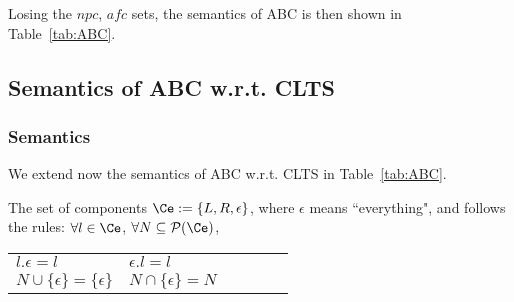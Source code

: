 \documentclass[adraft]{eptcs}
\newcommand{\tab}[1]{Table~\ref{tab:#1}}
\newcommand{\powset}[1]{\mathcal{P}(#1)} %
\newcommand{\npc}{\textit{npc}}                        %
\newcommand{\afc}{\textit{afc}}                        %
\begin{document}
Losing the $\npc$, $\afc$ sets, the semantics of ABC is then shown in \tab{ABC}.


\subsection{Semantics of ABC w.r.t. CLTS}

\subsubsection{Semantics}
We extend now the semantics of ABC w.r.t. CLTS in \tab{ABC}.

The set of components $\Ce := \{L, R, \epsilon \} $, where $\epsilon$ means ``everything", and follows the rules: $\forall l \in \Ce$, $\forall N \subseteq \powset{\Ce}$,

 \vspace{-1.2mm}
 \begin{center}
 \begin{tabular}{@{}l@{~~}l@{\qquad\quad}l@{~~}l@{\qquad\quad}l@{~~}l@{}}
 $l.\epsilon = l$&
 $\epsilon.l = l$\\
 $N \cup \{\epsilon\} = \{\epsilon\}$ &
 $N \cap \{\epsilon\} = N$\\
 \end{tabular}
 \end{center}
\end{document}
